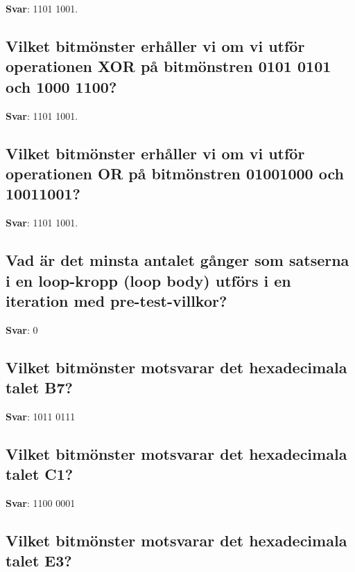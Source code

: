 \documentclass[a4paper,11pt,oneside]{article}
\begin{document}
\begin{sloppypar}
\label{q:417:sa:sv:True}

\textbf{Svar}: 1101 1001.



\subsection{Vilket bitm\"onster erh\r{a}ller vi om vi utf\"or operationen XOR p\r{a} bitm\"onstren 0101 0101 och 1000 1100?}

\label{q:418:sa:sv:True}

\textbf{Svar}: 1101 1001.



\subsection{Vilket bitm\"onster erh\r{a}ller vi om vi utf\"or operationen OR p\r{a} bitm\"onstren 01001000 och 10011001?}

\label{q:419:sa:sv:True}

\textbf{Svar}: 1101 1001.



\subsection{Vad \"ar det minsta antalet g\r{a}nger som satserna i en loop-kropp (loop body) utf\"ors i en iteration med pre-test-villkor?}

\label{q:420:sa:sv:True}

\textbf{Svar}: 0



\subsection{Vilket bitm\"onster motsvarar det hexadecimala talet B7?}

\label{q:421:sa:sv:True}

\textbf{Svar}: 1011 0111



\subsection{Vilket bitm\"onster motsvarar det hexadecimala talet C1?}

\label{q:422:sa:sv:True}

\textbf{Svar}: 1100 0001



\subsection{Vilket bitm\"onster motsvarar det hexadecimala talet E3?}


\end{sloppypar}
\end{document}
